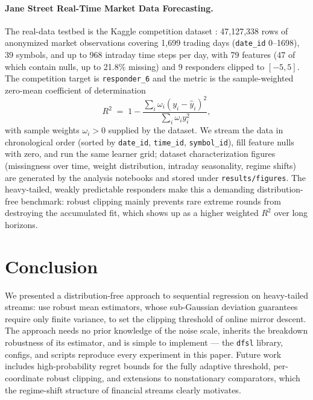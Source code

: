 \documentclass[11pt]{article}
\begin{document}
\paragraph{Jane Street Real-Time Market Data Forecasting.} The real-data testbed is the
Kaggle competition dataset \citep{janestreet2024kaggle}: 47{,}127{,}338 rows of
anonymized market observations covering 1{,}699 trading days (\texttt{date\_id}
0--1698), 39 symbols, and up to 968 intraday time steps per day, with 79 features
(47 of which contain nulls, up to 21.8\% missing) and 9 responders clipped to
$[-5, 5]$. The competition target is \texttt{responder\_6} and the metric is the
sample-weighted zero-mean coefficient of determination
\begin{equation}
R^2 \;=\; 1 - \frac{\sum_i \omega_i (y_i - \hat{y}_i)^2}{\sum_i \omega_i y_i^2},
\end{equation}
with sample weights $\omega_i > 0$ supplied by the dataset. We stream the data in
chronological order (sorted by \texttt{date\_id}, \texttt{time\_id},
\texttt{symbol\_id}), fill feature nulls with zero, and run the same learner grid;
dataset characterization figures (missingness over time, weight distribution, intraday
seasonality, regime shifts) are generated by the analysis notebooks and stored under
\texttt{results/figures}. The heavy-tailed, weakly predictable responders make this a
demanding distribution-free benchmark: robust clipping mainly prevents rare extreme
rounds from destroying the accumulated fit, which shows up as a higher weighted $R^2$
over long horizons.

\section{Conclusion}

We presented a distribution-free approach to sequential regression on heavy-tailed
streams: use robust mean estimators, whose sub-Gaussian deviation guarantees require
only finite variance, to set the clipping threshold of online mirror descent. The
approach needs no prior knowledge of the noise scale, inherits the breakdown robustness
of its estimator, and is simple to implement — the \texttt{dfsl} library, configs, and
scripts reproduce every experiment in this paper. Future work includes high-probability
regret bounds for the fully adaptive threshold, per-coordinate robust clipping, and
extensions to nonstationary comparators, which the regime-shift structure of financial
streams clearly motivates.

\appendix




\end{document}
